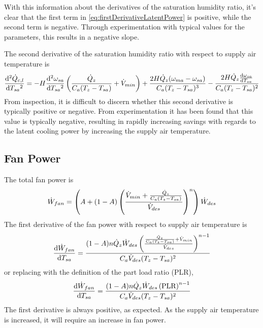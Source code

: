 With this information about the derivatives of the saturation humidity
ratio, it's clear that the first term in 
\ref{eq:firstDerivativeLatentPower} is positive, while the second term
is negative. Through experimentation with typical values for the
parameters, this results in a negative slope. 

The second derivative of the saturation humidity ratio with respect to
supply air temperature is
\begin{equation}
    \dv[2]{\dot{Q}_{c,l}}{T_{sa}{}}  =  -H \dv[2]{\omega_{sa}}{T_{sa}{}} \left(\frac{\dot{Q}_{z}}{C_{a}
            (T_{z}-T_{sa}{})}+\dot{V}_{min}\right)+\frac{2 H
            \dot{Q}_{z} (\omega_{ma}-\omega_{sa})}{C_{a}
            (T_{z}-T_{sa}{})^3}-\frac{2 H \dot{Q}_{z}
        \dv{\omega_{sa}}{T_{sa}{}}}{C_{a} (T_{z}-T_{sa}{})^2}
\end{equation}
From inspection, it is difficult to discern whether this second
derivative is typically positive or negative. From experimentation it
has been found that this value is typically negative, resulting in
rapidly increasing savings with regards to the latent cooling power by
increasing the supply air temperature. 

\subsection{Fan Power}

The total fan power is
\begin{equation}\label{eq:fanPowerForDerivative}
    \dot{W}_{fan} = \left(A + \left(1-A\right)\left(\frac{\dot{V}_{min} + \frac{\dot{Q}_{z}}{C_{a}\left(T_{z}-T_{sa}{}\right)}{}}{\dot{V}_{des}}\right)^{n}\right) \dot{W}_{des}
\end{equation}
The first derivative of the fan power with respect to supply air
temperature is
\begin{equation}
    \dv{\dot{W}_{fan}}{T_{sa}{}} =\frac{(1-A) n \dot{Q}_{z} \dot{W}_{des}
    \left(\frac{\frac{\dot{Q}_{z}}{C_{a}
(T_{z}-T_{sa}{})}+\dot{V}_{min}}{\dot{V}_{des}}\right)^{n-1}}{C_{a} \dot{V}_{des}
(T_{z}-T_{sa}{})^2} 
\end{equation}
or replacing with the definition of the part load ratio (PLR),
\begin{equation}
    \dv{\dot{W}_{fan}}{T_{sa}{}} =\frac{(1-A) n \dot{Q}_{z} \dot{W}_{des}
    \left( \text{PLR} \right)^{n-1}}{C_{a} \dot{V}_{des}
(T_{z}-T_{sa}{})^2} 
\end{equation}
The first derivative is always positive, as expected. As the supply air
temperature is increased, it will require an increase in fan power.

